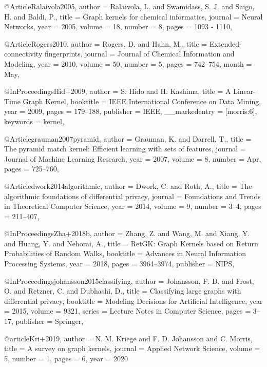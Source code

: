 @Article{Ralaivola2005,
  author  = {Ralaivola, L. and Swamidass, S. J. and Saigo, H. and Baldi, P.},
  title   = {Graph kernels for chemical informatics},
  journal = {Neural Networks},
  year    = {2005},
  volume  = {18},
  number  = {8},
  pages   = {1093 - 1110},
}

@Article{Rogers2010,
  author  = {Rogers, D. and Hahn, M.},
  title   = {Extended-connectivity fingerprints},
  journal = {Journal of Chemical Information and Modeling},
  year    = {2010},
  volume  = {50},
  number  = {5},
  pages   = {742--754},
  month   = {May},
}

@InProceedings{Hid+2009,
  author        = {S. Hido and H. Kashima},
  title         = {A Linear-Time Graph Kernel},
  booktitle     = {IEEE International Conference on Data Mining},
  year          = {2009},
  pages         = {179--188},
  publisher     = {IEEE},
  __markedentry = {[morris:6]},
  keywords      = {kernel},
}

@Article{grauman2007pyramid,
  author  = {Grauman, K. and Darrell, T.},
  title   = {The pyramid match kernel: Efficient learning with sets of features},
  journal = {Journal of Machine Learning Research},
  year    = {2007},
  volume  = {8},
  number  = {Apr},
  pages   = {725--760},
}

@Article{dwork2014algorithmic,
  author  = {Dwork, C. and Roth, A.},
  title   = {The algorithmic foundations of differential privacy},
  journal = {Foundations and Trends in Theoretical Computer Science},
  year    = {2014},
  volume  = {9},
  number  = {3--4},
  pages   = {211--407},
}

@InProceedings{Zha+2018b,
  author    = {Zhang, Z. and Wang, M. and Xiang, Y. and Huang, Y. and Nehorai, A.},
  title     = {RetGK: Graph Kernels based on Return Probabilities of Random Walks},
  booktitle = {Advances in Neural Information Processing Systems},
  year      = {2018},
  pages     = {3964--3974},
  publisher = {NIPS},
}



@InProceedings{johansson2015classifying,
  author    = {Johansson, F. D. and Frost, O. and Retzner, C. and Dubhashi, D.},
  title     = {Classifying large graphs with differential privacy},
  booktitle = {Modeling Decisions for Artificial Intelligence},
  year      = {2015},
  volume    = {9321},
  series    = {Lecture Notes in Computer Science},
  pages     = {3--17},
  publisher = {Springer},
}

@article{Kri+2019,
	author    = {N. M. Kriege and
	F. D. Johansson and
	C. Morris},
	title     = {A survey on graph kernels},
	journal   = {Applied Network Science},
	volume    = {5},
	number    = {1},
	pages     = {6},
	year      = {2020}
}

